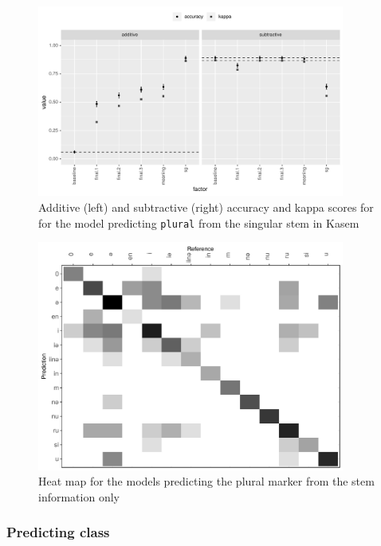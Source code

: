 \begin{figure}
  \centering
  \includegraphics[width=0.9\textwidth]{./figures/kasem/p-fi-plmark-sg-overall.pdf}
  \caption{Additive (left) and subtractive (right) accuracy and kappa scores for for the model predicting \texttt{plural} from the singular stem in Kasem}\label{fig:overall-fi-plural-sg}
\end{figure}

\begin{figure}
  \centering
  \includegraphics[width=0.9\textwidth]{./figures/kasem/p-plural-sg-cm.pdf}
  \caption{Heat map for the models predicting the plural marker from the stem information only}\label{fig:cm-plural}
\end{figure}


\subsubsection{Predicting class}

